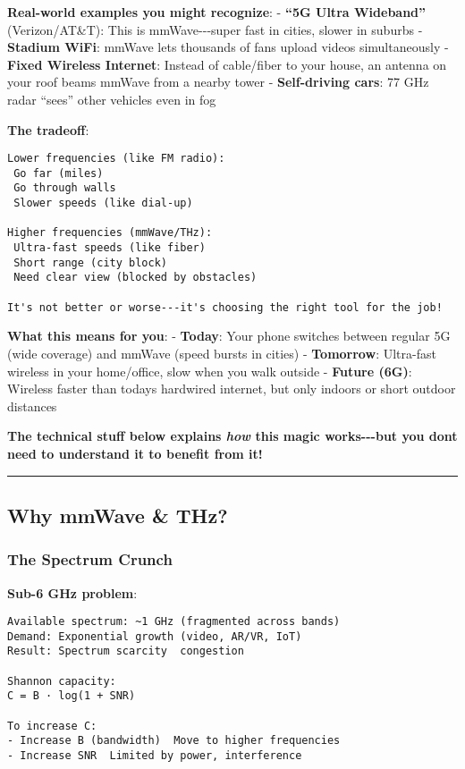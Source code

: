 \textbf{Real-world examples you might recognize}: - \textbf{``5G Ultra
Wideband''} (Verizon/AT\&T): This is mmWave-\/-\/-super fast in cities,
slower in suburbs - \textbf{Stadium WiFi}: mmWave lets thousands of fans
upload videos simultaneously - \textbf{Fixed Wireless Internet}: Instead
of cable/fiber to your house, an antenna on your roof beams mmWave from
a nearby tower - \textbf{Self-driving cars}: 77 GHz radar ``sees'' other
vehicles even in fog

\textbf{The tradeoff}:

\begin{verbatim}
Lower frequencies (like FM radio):
 Go far (miles)
 Go through walls
 Slower speeds (like dial-up)

Higher frequencies (mmWave/THz):
 Ultra-fast speeds (like fiber)
 Short range (city block)
 Need clear view (blocked by obstacles)

It's not better or worse---it's choosing the right tool for the job!
\end{verbatim}

\textbf{What this means for you}: - \textbf{Today}: Your phone switches
between regular 5G (wide coverage) and mmWave (speed bursts in cities) -
\textbf{Tomorrow}: Ultra-fast wireless in your home/office, slow when
you walk outside - \textbf{Future (6G)}: Wireless faster than
today\textquotesingle s hardwired internet, but only indoors or short
outdoor distances

\textbf{The technical stuff below explains \emph{how} this magic
works-\/-\/-but you don\textquotesingle t need to understand it to
benefit from it!}

\begin{center}\rule{0.5\linewidth}{0.5pt}\end{center}

\subsection{\texorpdfstring{ Why mmWave \&
THz?}{ Why mmWave \& THz?}}\label{why-mmwave-thz}

\subsubsection{The Spectrum Crunch}\label{the-spectrum-crunch}

\textbf{Sub-6 GHz problem}:

\begin{verbatim}
Available spectrum: ~1 GHz (fragmented across bands)
Demand: Exponential growth (video, AR/VR, IoT)
Result: Spectrum scarcity  congestion

Shannon capacity:
C = B · log(1 + SNR)

To increase C:
- Increase B (bandwidth)  Move to higher frequencies 
- Increase SNR  Limited by power, interference
\end{verbatim}

